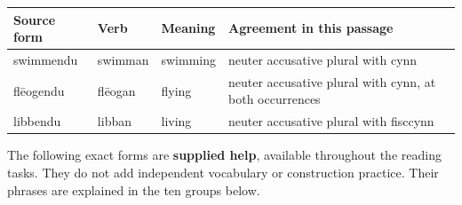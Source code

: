 \par\begingroup
\fontsize{10.5}{13.2}\selectfont
\setlength{\LTleft}{0pt}\setlength{\LTright}{\fill}
\noindent
\begin{tabular}{@{}>{\raggedright\arraybackslash}p{21.01mm}>{\raggedright\arraybackslash}p{19.01mm}>{\raggedright\arraybackslash}p{19.01mm}>{\raggedright\arraybackslash}p{56.54mm}@{}}
\toprule
\textbf{Source form} & \textbf{Verb} & \textbf{Meaning} & \textbf{Agreement in this passage} \\
\midrule
swimmendu & swimman & swimming & neuter accusative plural with cynn \\
flēogendu & flēogan & flying & neuter accusative plural with cynn, at both occurrences \\
libbendu & libban & living & neuter accusative plural with fisccynn \\
\bottomrule
\end{tabular}
\par\endgroup

The following exact forms are \textbf{supplied help}, available throughout the reading tasks. They do not add independent vocabulary or construction practice. Their phrases are explained in the ten groups below.

